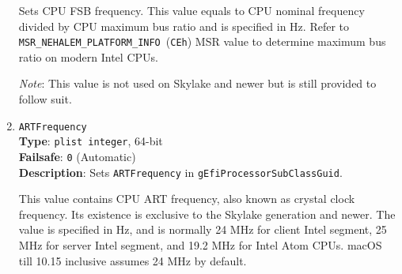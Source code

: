 \documentclass[]{article}
\begin{document}
\begin{enumerate}
  Sets CPU FSB frequency. This value equals to CPU nominal frequency divided
  by CPU maximum bus ratio and is specified in Hz. Refer to
  \texttt{MSR\_NEHALEM\_PLATFORM\_INFO}~(\texttt{CEh}) MSR value to determine
  maximum bus ratio on modern Intel CPUs.

  \emph{Note}: This value is not used on Skylake and newer but is still provided
  to follow suit.
\item
  \texttt{ARTFrequency}\\
  \textbf{Type}: \texttt{plist\ integer}, 64-bit\\
  \textbf{Failsafe}: \texttt{0} (Automatic)\\
  \textbf{Description}: Sets \texttt{ARTFrequency} in
  \texttt{gEfiProcessorSubClassGuid}.

  This value contains CPU ART frequency, also known as crystal clock frequency.
  Its existence is exclusive to the Skylake generation and newer. The value is specified
  in Hz, and is normally 24 MHz for client Intel segment, 25 MHz for server Intel segment,
  and 19.2 MHz for Intel Atom CPUs. macOS till 10.15 inclusive assumes 24 MHz by default.


\end{enumerate}
\end{document}
